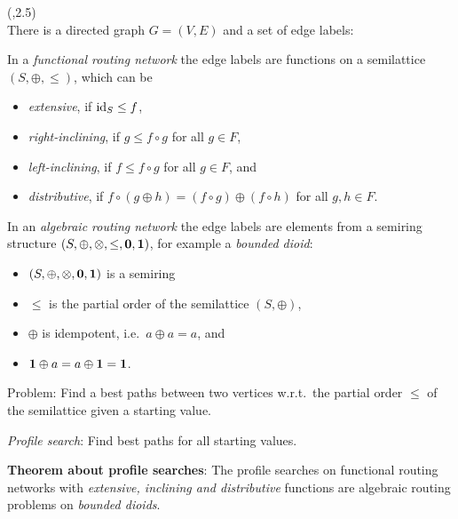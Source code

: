 \begin{textblock}{\mycolwidth}(\rightpos,2.5)
 \\
There is a directed graph $G = (V, E)$ and a set of edge labels:
\begin{multicols}{2}
In a \emph{functional routing network} the edge labels are
functions on a semilattice $(S, \oplus, \leq)$, which can be
\begin{itemize}
  \item \emph{extensive}, if $\text{id}_S \leq f$,
  \item \emph{right-inclining}, if $g \leq f \circ g$ for all $g \in F$,
  \item \emph{left-inclining}, if $f \leq f \circ g$ for all $g \in F$, and
  \item \emph{distributive}, if $f \circ (g \oplus h) = (f \circ g) \oplus (f \circ h)$
  for all $g, h \in F$.
\end{itemize}
In an \emph{algebraic routing network} the edge labels are elements from a semiring structure $(S, \oplus, \otimes, \leq, \textbf{0}, \textbf{1})$, for example a \emph{bounded dioid}:
\begin{itemize}
  \item $(S, \oplus, \otimes, \textbf{0}, \textbf{1})$ is a semiring
  \item $\leq$ is the partial order of the semilattice $(S, \oplus)$,
  \item $\oplus$ is idempotent, i.e.\ $a \oplus a = a$, and
  \item $\textbf{1} \oplus a = a \oplus \textbf{1} = \textbf{1}$.
\end{itemize}
\end{multicols}
Problem: Find a best paths between two vertices w.r.t.~the partial order $\leq$ of the semilattice given a starting value.

\emph{Profile search}: Find best paths for all starting values.

\textbf{Theorem about profile searches}:
The profile searches on functional routing networks with
\emph{extensive, inclining and distributive}
functions are algebraic routing problems on \emph{bounded dioids}.
\end{textblock}


